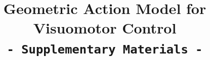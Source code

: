 \documentclass{article}
\begin{document}


\clearpage

\title{Geometric Action Model for Visuomotor Control\\\texttt{- Supplementary Materials -}}


\appendix


\clearpage
\end{document}
